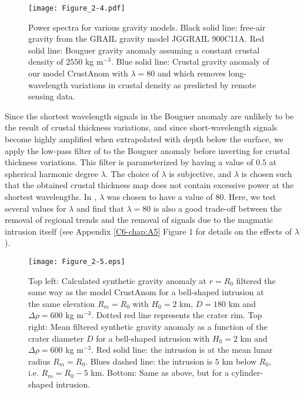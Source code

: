 \begin{figure}[h!]
  \graphicspath{ {/Users/thorey/Documents/These/Projet/FFC/Gravi_GRAIL/Article/Papier/Proof/} }
  \begin{center}
    \texttt{[image: Figure\_2-4.pdf]}
    \caption{Power spectra  for various  gravity models.   Black solid
      line:  free-air gravity  from  the GRAIL  gravity model  JGGRAIL
      900C11A.   Red solid  line: Bouguer  gravity anomaly  assuming a
      constant  crustal density  of  $2550$ kg  m$^{-3}$.  Blue  solid
      line:  Crustal  gravity  anomaly  of our  model  CrustAnom  with
      $\lambda=80$  and which  removes  long-wavelength variations  in
      crustal density as predicted by remote sensing data.}
    \label{C6-Figure2-4}
  \end{center}
\end{figure}

Since  the shortest  wavelength  signals in  the  Bouguer anomaly  are
unlikely to be  the result of crustal thickness  variations, and since
short-wavelength  signals become  highly  amplified when  extrapolated
with  depth  below  the  surface,  we apply  the  low-pass  filter  of
\citet{wieczorek:1998th} to  the Bouguer anomaly before  inverting for
crustal thickness variations.  This  filter is parameterized by having
a value of $0.5$ at spherical harmonic degree $\lambda$. The choice of
$\lambda$  is  subjective,  and  $\lambda$ is  chosen  such  that  the
obtained crustal thickness map does not contain excessive power at the
shortest  wavelengths.   In \citet{Wieczorek:2013ipa},  $\lambda$  was
chosen to  have a  value of  $80$.  Here, we  test several  values for
$\lambda$ and find that $\lambda=80$  is also a good trade-off between
the removal of  regional trends and the removal of  signals due to the
magmatic  intrusion itself  (see Appendix  \ref{C6-chap:A5} Figure  1 for
details on the effects of $\lambda$).

\begin{figure}[h!]
  \graphicspath{ {/Users/thorey/Documents/These/Projet/FFC/Gravi_GRAIL/Article/Papier/Proof/} }
  \begin{center}
    \texttt{[image: Figure\_2-5.eps]}
    \caption{Top left: Calculated synthetic gravity anomaly at $r=R_0$
      filtered the same  way as the model CrustAnom  for a bell-shaped
      intrusion at the  same elevation $R_m = R_0$ with  $H_0 = 2$ km,
      $D =  180$ km and $\Delta  \rho = 600$ kg  m$^{-3}$.  Dotted red
      line  represents  the  crater  rim.  Top  right:  Mean  filtered
      synthetic gravity anomaly  as a function of  the crater diameter
      $D$  for  a  bell-shaped  intrusion   with  $H_0  =  2$  km  and
      $\Delta \rho = 600$ kg  m$^{-3}$.  Red solid line: the intrusion
      is at  the mean lunar  radius $R_m=R_0$. Blues dashed  line: the
      intrusion is  $5$ km below  $R_0$, i.e. $R_m=R_0-5$  km. Bottom:
      Same as above, but for a cylinder-shaped intrusion.}
    \label{C6-Figure2-5}
  \end{center}
\end{figure}

